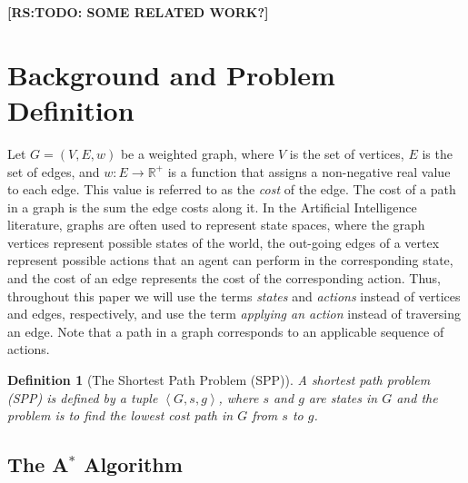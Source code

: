 \documentclass{aicom2e}
\newtheorem{definition}{Definition}
\newcommand{\astar}{A$^*$}
\newcommand{\tuple}[1]{\ensuremath{\left \langle #1 \right \rangle }}
\newcommand{\roni}[1]{\textbf{[RS:#1]}}
\begin{document}
\roni{TODO: SOME RELATED WORK?}

\section{Background and Problem Definition}


Let $G=(V,E,w)$ be a weighted graph, where $V$ is the set of vertices, $E$ is the set of edges, and $w:E\rightarrow \mathbb{R}^+$ is a function that assigns a non-negative real value to each edge. This value is referred to as the {\em cost} of the edge. The cost of a path in a graph is the sum the edge costs along it. 
In the Artificial Intelligence literature, graphs are often used to represent state spaces, 
where the graph vertices represent possible states of the world, the out-going edges of a vertex represent possible actions that an agent can perform in the corresponding state, and the cost of an edge represents the cost of the corresponding action. 
Thus, throughout this paper we will use the terms {\em states} and {\em actions} instead of vertices and edges, respectively, and use the term {\em applying an action} instead of traversing an edge. Note that a path in a graph corresponds to an applicable sequence of actions. 

\begin{definition}[The Shortest Path Problem (SPP)]
A shortest path problem (SPP) is defined by a tuple $\tuple{G,s, g}$, 
where $s$ and $g$ are states in $G$ and the problem is to find the lowest cost path in $G$ from $s$ to $g$. 
\label{def:spp}
\end{definition}

\subsection{The \astar{} Algorithm}
\end{document}

